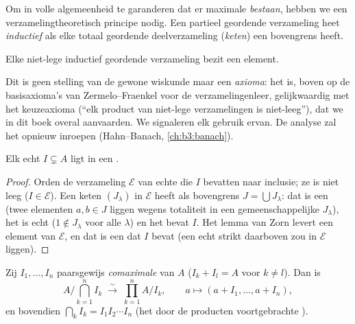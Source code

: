 Om in volle algemeenheid te garanderen dat er maximale 
\emph{bestaan}, hebben we een verzamelingtheoretisch principe
nodig. Een partieel geordende verzameling heet \emph{inductief} als
elke totaal geordende deelverzameling (\emph{keten}) een
bovengrens heeft.

\begin{theorem}\label{thm:b3:rings:zorn}
Elke niet-lege inductief geordende verzameling bezit een 
element.
\admitted
\end{theorem}

\begin{remark}\label{rem:b3:rings:zorn}
Dit is geen stelling van de gewone wiskunde maar een
\emph{axioma}: het is, boven op de basisaxioma's van
Zermelo--Fraenkel voor de verzamelingenleer, gelijkwaardig met het
keuzeaxioma (``elk product van niet-lege verzamelingen is
niet-leeg''), dat we in dit boek overal aanvaarden. We signaleren
elk gebruik ervan. De analyse zal het opnieuw inroepen
(Hahn--Banach, \cref{ch:b3:banach}).
\end{remark}

\begin{theorem}[Krull]\label{thm:b3:rings:krull}
Elk echt  $I \subsetneq A$ ligt in een .
\end{theorem}

\begin{proof}
Orden de verzameling $\mathcal E$ van echte  die $I$
bevatten naar inclusie; ze is niet leeg ($I \in \mathcal E$). Een
keten $(J_\lambda)$ in $\mathcal E$ heeft als bovengrens $J =
\bigcup J_\lambda$: dat is een  (twee elementen $a, b \in J$
liggen wegens totaliteit in een gemeenschappelijke $J_\lambda$),
het is echt ($1 \notin J_\lambda$ voor alle $\lambda$) en het bevat
$I$. Het lemma van Zorn levert een  element van $\mathcal
E$, en dat is een  dat $I$ bevat (een echt 
strikt daarboven zou in $\mathcal E$ liggen).
\end{proof}

\begin{theorem}\label{thm:b3:rings:crt}
Zij $I_1, \dots, I_n$ paarsgewijs
\emph{comaximale}  van $A$ ($I_k +
I_l = A$ voor $k \neq l$). Dan is
\[
A\Big/\bigcap_{k=1}^n I_k \;\xrightarrow{\;\sim\;}\;
\prod_{k=1}^n A/I_k,
\qquad
a \longmapsto (a + I_1, \dots, a + I_n),
\]
en bovendien $\bigcap_k I_k = I_1 I_2 \cdots I_n$ (het door de
producten voortgebrachte ).
\end{theorem}

